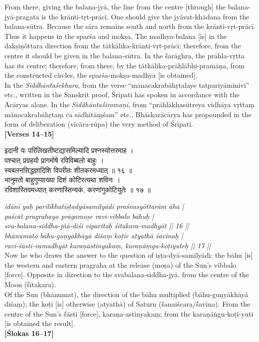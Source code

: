 \documentclass[11pt,a4paper]{article}
\newcommand{\dev}[1]{{\devanagarifont #1}}
\newcommand{\bilingualpair}[2]{%
  \noindent%
  \begin{minipage}[t]{0.48\textwidth}
    #1%
  \end{minipage}%
  \hfill%
  \begin{minipage}[t]{0.48\textwidth}
    #2%
  \end{minipage}%
  \par\vspace{0.5em}%
}
\newenvironment{sanskritcol}{\devanagarifont\small}{}
\newenvironment{englishcol}{\iastfont\small}{}
\begin{document}
{\begin{englishcol}
From there, giving the balana-jyā, the line from the centre [through] the balana-jyā-pragata is the krānti-tṛt-prācī. One should give the jyāvat-khādana from the balana-sūtra. Because the sāra remains south and north from the krānti-vṛt-prācī. Thus it happens in the sparśa and mokṣa. The madhya-balana [is] in the dakṣiṇôttara direction from the tātkālika-krānti-vṛt-prācī; therefore, from the centre it should be given in the balana-sūtra. In the \'śarāghra, the prāhla-vṛtta has its centre; therefore, from there, by the tātkālika-prāhlābhi-pramāṇa, from the constructed circles, the sparśa-mokṣa-madhya [is obtained].\\[0.3em]
In the \textit{Siddhānta\'sek\-{}hara}, from the verse ``mānacakrabāhṛtalaye tatpariyāminivi'' etc., written in the Sanskrit proof, Śrīpati has spoken in accordance with the Ācāryas alone. In the \textit{Siddhānta\'śiro\-{}maṇi}, from ``prāhlākhasūtreya vidhāya vṛttaṃ mānacakrabāhṛtaṃ ca sādhitāṃśam'' etc., Bhāskarācārya has propounded in the form of deliberation (vicāra-rūpa) the very method of Śrīpati.\\[0.3em]
\hfill \textbf{[Verses 14--15]}
\end{englishcol}%
}

\vspace{0.5cm}
\bilingualpair{%
\begin{sanskritcol}
\dev{इदानी यः परिलिखतीष्टद्यासमिल्यादि प्रश्नस्योत्तरमाह ।}\\[0.3em]
\dev{पश्चात् प्रग्रहयो प्रागमोषे रविविब्बलो बाहुः ।}\\[0.3em]
\dev{स्वबलनसिद्धज्ञादिशि विपरीतः शीतकरमध्यात् ॥ १६ ॥}\\[0.3em]
\dev{भानुमतो बाहुगुण्याख्या दिशं कोटिरत्यथा शविनः ।}\\[0.3em]
\dev{रविशास्तिवमध्यात् करणास्तिन्यकं, करणांगुकोटियुतेः ॥ १७ ॥}
\end{sanskritcol}%
}{%
\begin{englishcol}
\textit{idānī yaḥ parilikhatīṣṭadyāsamilyādi praśnasyôttarām āha |}\\[0.3em]
\textit{paścāt pragrahayo prāgamoṣe ravi-vibbalo bāhuḥ |}\\[0.3em]
\textit{sva-balana-siddha-jñā-diśi viparītaḥ śītakara-madhyāt || 16 ||}\\[0.3em]
\textit{bhānumato bāhu-guṇyākhāyā diśaṃ koṭir atyathā śavinaḥ |}\\[0.3em]
\textit{ravi-śāsti-vamadhyāt karaṇāstinyakaṃ, karaṇāṃgu-koṭiyuteḥ || 17 ||}\\[0.3em]
Now he who draws the answer to the question of iṣṭa-dyā-samīlyādi: the bāhu [is] the western and eastern pragraha at the release (moṣa) of the Sun's vibbalo [force]. Opposite in direction to the svabalana-siddha-jyā, from the centre of the Moon (\'śītakara).\\[0.3em]
Of the Sun (bhānumat), the direction of the bāhu multiplied (bāhu-guṇyākhāyā diśaṃ); the koṭi [is] otherwise (atyathā) of Saturn (\'śanaiścara/\'śavina). From the centre of the Sun's \'śāsti [force], karaṇa-astinyakaṃ; from the karaṇāṅgu-koṭi-yuti [is obtained the result].\\[0.3em]
\hfill \textbf{[Ślokas 16--17]}
\end{englishcol}%
}
\end{document}
